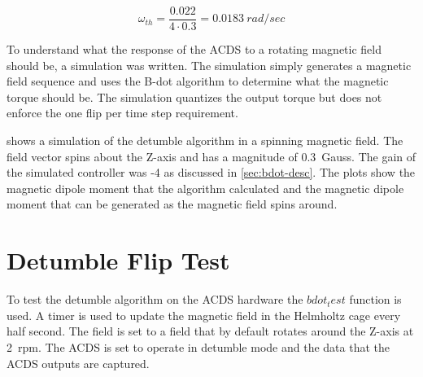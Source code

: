 \begin{equation}
    \omega _ {th} =  \frac{0.022}{4 \cdot 0.3} = 0.0183 ~ \unit{rad / sec}
    \label{eq:omega-th-calc}
\end{equation}

To understand what the response of the \ac{ACDS} to a rotating magnetic field should be, a simulation was written. The simulation simply generates a magnetic field sequence and uses the B-dot algorithm to determine what the magnetic torque should be. The simulation quantizes the output torque but does not enforce the one flip per time step requirement.


 shows a simulation of the detumble algorithm in a spinning magnetic field. The field vector spins about the Z-axis and has a magnitude of 0.3~Gauss. The gain of the simulated controller was -4 as discussed in \cref{sec:bdot-desc}. The plots show the magnetic dipole moment that the algorithm calculated and the magnetic dipole moment that can be generated as the magnetic field spins around.


\section{Detumble Flip Test}

To test the detumble algorithm on the \ac{ACDS} hardware the \lstMat$bdot_test$ function is used. A timer is used to update the magnetic field in the Helmholtz cage every half second. The field is set to a field that by default rotates around the Z-axis at 2~rpm. The \ac{ACDS} is set to operate in detumble mode and the data that the \ac{ACDS} outputs are captured.


